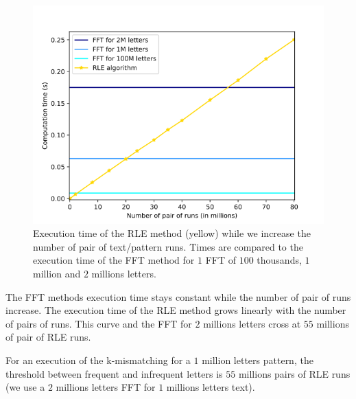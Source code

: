 \documentclass[preprint,12pt]{elsarticle}
\begin{document}
\begin{figure}[h]
\centering
\includegraphics[scale=0.7]{./figures/OptiComparOptiNaivHD.png}
\caption{Execution time of the RLE method (yellow) while we increase the number of pair of text/pattern runs.
Times are compared to the execution time of the FFT method for $1$ FFT of $100$ thousands,
$1$ million and $2$ millions letters.}
\label{OptiComp}
\end{figure}

The FFT methods execution time stays constant while the number of pair of runs increase. 
The execution time of the RLE method grows linearly with the number of pairs of runs.
This curve and the FFT for $2$ millions letters cross at $55$ millions of pair of RLE runs.   

For an execution of the k-mismatching for a $1$ million letters pattern,
the threshold between frequent and infrequent letters is $55$ millions pairs of RLE runs
(we use a $2$ millions letters FFT for $1$ millions letters text).




\end{document}
